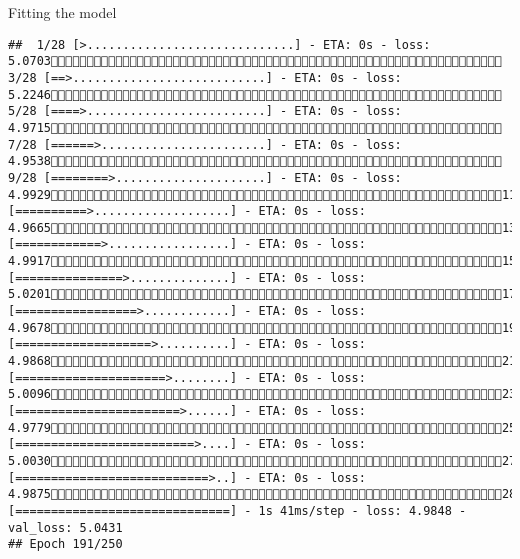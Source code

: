 \documentclass[
  ignorenonframetext,
]{beamer}
\begin{document}
\begin{frame}[fragile]{Fitting the model}
\begin{verbatim}
##  1/28 [>.............................] - ETA: 0s - loss: 5.0703 3/28 [==>...........................] - ETA: 0s - loss: 5.2246 5/28 [====>.........................] - ETA: 0s - loss: 4.9715 7/28 [======>.......................] - ETA: 0s - loss: 4.9538 9/28 [========>.....................] - ETA: 0s - loss: 4.992911/28 [==========>...................] - ETA: 0s - loss: 4.966513/28 [============>.................] - ETA: 0s - loss: 4.991715/28 [===============>..............] - ETA: 0s - loss: 5.020117/28 [=================>............] - ETA: 0s - loss: 4.967819/28 [===================>..........] - ETA: 0s - loss: 4.986821/28 [=====================>........] - ETA: 0s - loss: 5.009623/28 [=======================>......] - ETA: 0s - loss: 4.977925/28 [=========================>....] - ETA: 0s - loss: 5.003027/28 [===========================>..] - ETA: 0s - loss: 4.987528/28 [==============================] - 1s 41ms/step - loss: 4.9848 - val_loss: 5.0431
## Epoch 191/250

\end{verbatim}
\end{frame}
\end{document}
